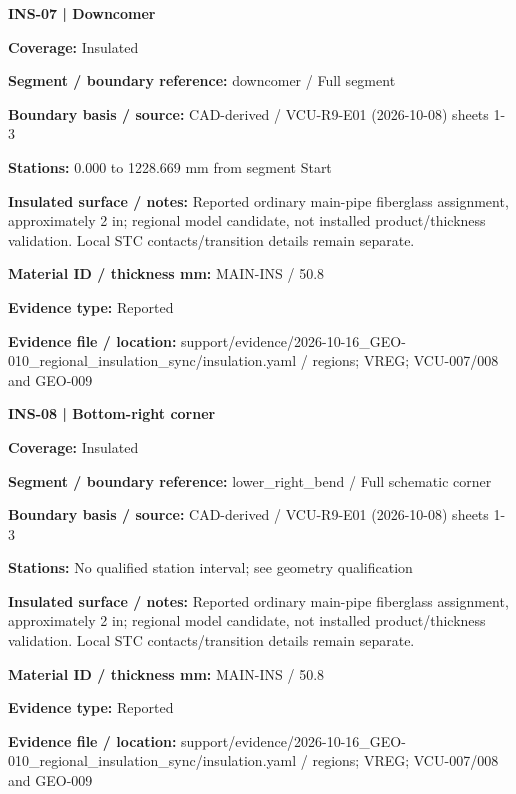 \documentclass[11pt]{article}
\begin{document}
\par\noindent\begin{minipage}{\textwidth}\small\setlength{\parskip}{2pt}
{\bfseries INS-07 | Downcomer}\par
\textbf{Coverage:} Insulated\par
\textbf{Segment / boundary reference:} downcomer / Full segment\par
\textbf{Boundary basis / source:} CAD-derived / VCU-R9-E01 (2026-10-08) sheets 1-3\par
\textbf{Stations:} 0.000 to 1228.669 mm from segment Start\par
\textbf{Insulated surface / notes:} Reported ordinary main-pipe fiberglass assignment, approximately 2 in; regional model candidate, not installed product/thickness validation. Local STC contacts/transition details remain separate.\par
\textbf{Material ID / thickness mm:} MAIN-INS / 50.8\par
\textbf{Evidence type:} Reported\par
\textbf{Evidence file / location:} support/evidence/2026-10-16\_\allowbreak{}GEO-010\_\allowbreak{}regional\_\allowbreak{}insulation\_\allowbreak{}sync/insulation.yaml / regions; VREG; VCU-007/008 and GEO-009\par
\end{minipage}\par\vspace{5pt}
\par
\par\noindent\begin{minipage}{\textwidth}\small\setlength{\parskip}{2pt}
{\bfseries INS-08 | Bottom-right corner}\par
\textbf{Coverage:} Insulated\par
\textbf{Segment / boundary reference:} lower\_\allowbreak{}right\_\allowbreak{}bend / Full schematic corner\par
\textbf{Boundary basis / source:} CAD-derived / VCU-R9-E01 (2026-10-08) sheets 1-3\par
\textbf{Stations:} No qualified station interval; see geometry qualification\par
\textbf{Insulated surface / notes:} Reported ordinary main-pipe fiberglass assignment, approximately 2 in; regional model candidate, not installed product/thickness validation. Local STC contacts/transition details remain separate.\par
\textbf{Material ID / thickness mm:} MAIN-INS / 50.8\par
\textbf{Evidence type:} Reported\par
\textbf{Evidence file / location:} support/evidence/2026-10-16\_\allowbreak{}GEO-010\_\allowbreak{}regional\_\allowbreak{}insulation\_\allowbreak{}sync/insulation.yaml / regions; VREG; VCU-007/008 and GEO-009\par
\end{minipage}\par\vspace{5pt}
\end{document}
